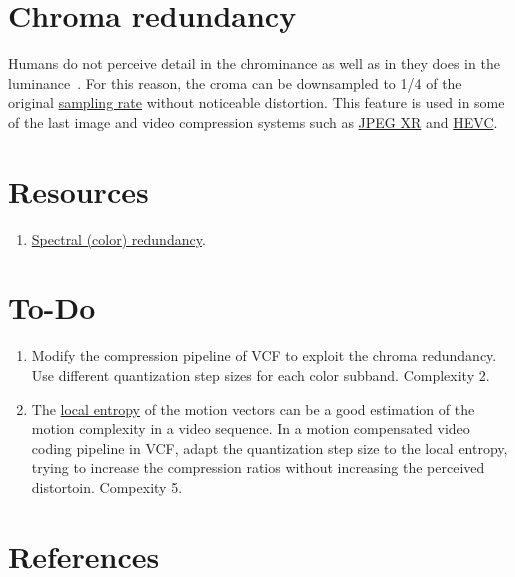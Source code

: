 \section{Chroma redundancy}

Humans do not perceive detail in the chrominance as well as in they
does in the luminance~\cite{burger2016digital}. For this reason, the
croma can be downsampled to 1/4 of the original
\href{https://en.wikipedia.org/wiki/Sampling_(signal_processing)}{sampling
  rate} without noticeable distortion. This feature is used in some of
the last image and video compression systems such as
\href{https://en.wikipedia.org/wiki/JPEG_XR#Description}{JPEG XR} and
\href{https://en.wikipedia.org/wiki/High_Efficiency_Video_Coding#Video_coding_layer}{HEVC}.

\section{Resources}
\begin{enumerate}
\item \href{https://github.com/vicente-gonzalez-ruiz/color_transforms/blob/main/docs/color_redundancy.ipynb}{Spectral
    (color) redundancy}.
\end{enumerate}

\section{To-Do}
\begin{enumerate}
\item Modify the compression pipeline of VCF to exploit the chroma
  redundancy. Use different quantization step sizes for each color
  subband. Complexity 2.
\item The
  \href{https://scikit-image.org/docs/stable/auto_examples/filters/plot_entropy.html}{local
    entropy} of the motion vectors can be a good estimation of the
  motion complexity in a video sequence. In a motion compensated video
  coding pipeline in VCF, adapt the quantization step size to the
  local entropy, trying to increase the compression ratios without
  increasing the perceived distortoin. Compexity 5.
\end{enumerate}

\section{References}

\renewcommand{\addcontentsline}[3]{}%

